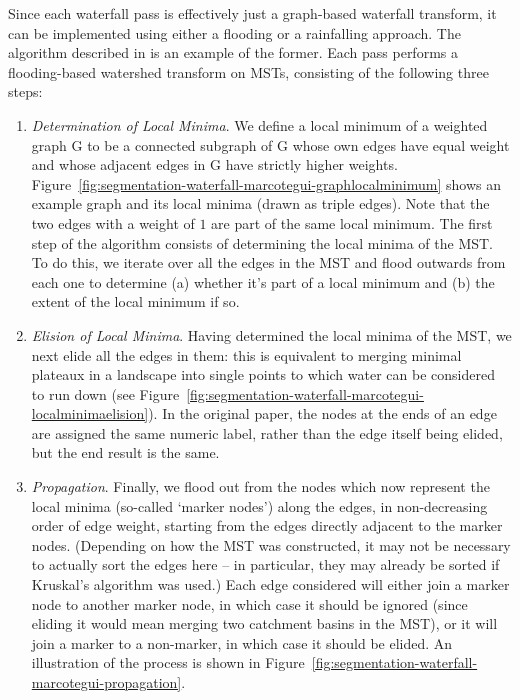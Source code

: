 Since each waterfall pass is effectively just a graph-based waterfall transform, it can be implemented using either a flooding or a rainfalling approach. The algorithm described in \cite{marcotegui05} is an example of the former. Each pass performs a flooding-based watershed transform on MSTs, consisting of the following three steps:

\begin{enumerate}

\item \emph{Determination of Local Minima}. We define a local minimum of a weighted graph G to be a connected subgraph of G whose own edges have equal weight and whose adjacent edges in G have strictly higher weights. Figure~\ref{fig:segmentation-waterfall-marcotegui-graphlocalminimum} shows an example graph and its local minima (drawn as triple edges). Note that the two edges with a weight of $1$ are part of the same local minimum. The first step of the algorithm consists of determining the local minima of the MST. To do this, we iterate over all the edges in the MST and flood outwards from each one to determine (a) whether it's part of a local minimum and (b) the extent of the local minimum if so.


\item \emph{Elision of Local Minima}. Having determined the local minima of the MST, we next elide all the edges in them: this is equivalent to merging minimal plateaux in a landscape into single points to which water can be considered to run down (see Figure~\ref{fig:segmentation-waterfall-marcotegui-localminimaelision}). In the original paper, the nodes at the ends of an edge are assigned the same numeric label, rather than the edge itself being elided, but the end result is the same.


\item \emph{Propagation}. Finally, we flood out from the nodes which now represent the local minima (so-called `marker nodes') along the edges, in non-decreasing order of edge weight, starting from the edges directly adjacent to the marker nodes. (Depending on how the MST was constructed, it may not be necessary to actually sort the edges here -- in particular, they may already be sorted if Kruskal's algorithm was used.) Each edge considered will either join a marker node to another marker node, in which case it should be ignored (since eliding it would mean merging two catchment basins in the MST), or it will join a marker to a non-marker, in which case it should be elided. An illustration of the process is shown in Figure~\ref{fig:segmentation-waterfall-marcotegui-propagation}.

\end{enumerate}

